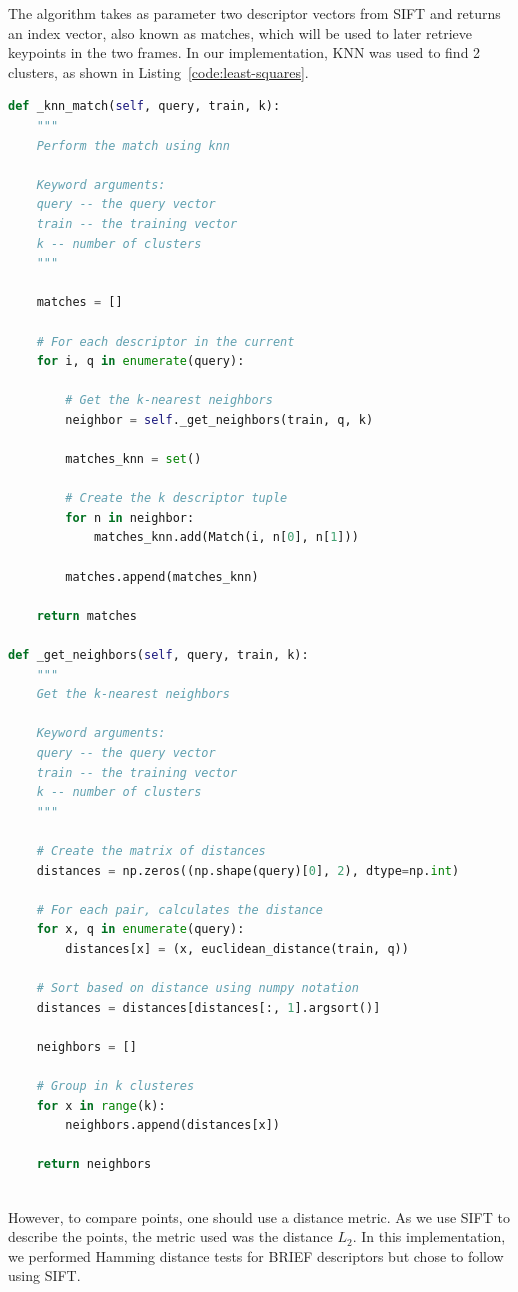 \documentclass[]{IEEEtran}
\begin{document}
The algorithm takes as parameter two descriptor vectors from SIFT and returns an index vector, also known as matches, which will be used to later retrieve keypoints in the two frames. In our implementation, KNN was used to find 2 clusters, as shown in Listing~\ref{code:least-squares}.


 \begin{lstlisting}[language=Python, caption={K-nearest neighbors}, label={code:knn}]
 def _knn_match(self, query, train, k):
    """
    Perform the match using knn

    Keyword arguments:
    query -- the query vector
    train -- the training vector
    k -- number of clusters
    """

    matches = []

    # For each descriptor in the current
    for i, q in enumerate(query):

        # Get the k-nearest neighbors
        neighbor = self._get_neighbors(train, q, k)

        matches_knn = set()

        # Create the k descriptor tuple
        for n in neighbor:
            matches_knn.add(Match(i, n[0], n[1]))

        matches.append(matches_knn)

    return matches

def _get_neighbors(self, query, train, k):
    """
    Get the k-nearest neighbors

    Keyword arguments:
    query -- the query vector
    train -- the training vector
    k -- number of clusters
    """

    # Create the matrix of distances
    distances = np.zeros((np.shape(query)[0], 2), dtype=np.int)

    # For each pair, calculates the distance
    for x, q in enumerate(query):
        distances[x] = (x, euclidean_distance(train, q))

    # Sort based on distance using numpy notation
    distances = distances[distances[:, 1].argsort()]

    neighbors = []

    # Group in k clusteres
    for x in range(k):
        neighbors.append(distances[x])

    return neighbors
    
\end{lstlisting}

However, to compare points, one should use a distance metric. As we use SIFT to describe the points, the metric used was the distance $L_2$. In this implementation, we performed Hamming distance tests for BRIEF descriptors but chose to follow using SIFT.
\end{document}
